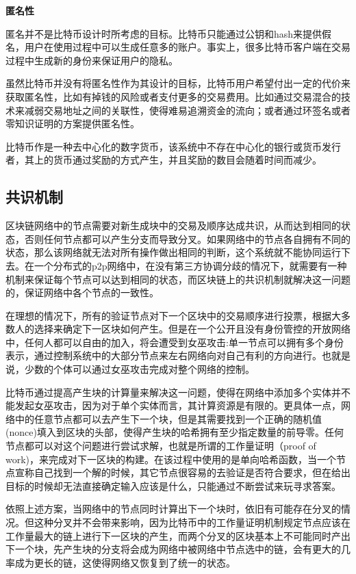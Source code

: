 \noindent\textbf{匿名性}

匿名并不是比特币设计时所考虑的目标。比特币只能通过公钥和hash来提供假名，用户在使用过程中可以生成任意多的账户。事实上，很多比特币客户端在交易过程中生成新的身份来保证用户的隐私。

虽然比特币并没有将匿名性作为其设计的目标，比特币用户希望付出一定的代价来获取匿名性，比如有掉钱的风险或者支付更多的交易费用。比如通过交易混合\supercite{bonneau2014mixcoin}的技术来减弱交易地址之间的关联性，使得难易追溯资金的流向；或者通过环签名或者零知识证明\supercite{kosba2016hawk}的方案提供匿名性。


比特币作是一种去中心化的数字货币，该系统中不存在中心化的银行或货币发行者，其上的货币通过奖励的方式产生，并且奖励的数目会随着时间而减少。

\subsection{共识机制}

区块链网络中的节点需要对新生成块中的交易及顺序达成共识，从而达到相同的状态，否则任何节点都可以产生分支而导致分叉。如果网络中的节点各自拥有不同的状态，那么该网络就无法对所有操作做出相同的判断，这个系统就不能协同运行下去。在一个分布式的p2p网络中，在没有第三方协调分歧的情况下，就需要有一种机制来保证每个节点可以达到相同的状态，而区块链上的共识机制就解决这一问题的，保证网络中各个节点的一致性。

在理想的情况下，所有的验证节点对下一个区块中的交易顺序进行投票，根据大多数人的选择来确定下一区块如何产生。但是在一个公开且没有身份管控的开放网络中，任何人都可以自由的加入，将会遭受到女巫攻击\supercite{douceur2002sybil}:单一节点可以拥有多个身份表示，通过控制系统中的大部分节点来左右网络向对自己有利的方向进行。也就是说，少数的个体可以通过女巫攻击完成对整个网络的控制。

比特币通过提高产生块的计算量来解决这一问题，使得在网络中添加多个实体并不能发起女巫攻击，因为对于单个实体而言，其计算资源是有限的。更具体一点，网络中的任意节点都可以去产生下一个块，但是其需要找到一个正确的随机值(nonce)填入到区块的头部，使得产生块的哈希拥有至少指定数量的前导零\supercite{antonopoulos2014mastering}。任何节点都可以对这个问题进行尝试求解，也就是所谓的工作量证明（proof of work)，来完成对下一区块的构建\supercite{nakamoto2008bitcoin}。在该过程中使用的是单向哈希函数，当一个节点宣称自己找到一个解的时候，其它节点很容易的去验证是否符合要求，但在给出目标的时候却无法直接确定输入应该是什么，只能通过不断尝试来玩寻求答案。

依照上述方案，当网络中的节点同时计算出下一个块时，依旧有可能存在分叉的情况。但这种分叉并不会带来影响，因为比特币中的工作量证明机制规定节点应该在工作量最大的链上进行下一区块的产生，而两个分叉的区块基本上不可能同时产出下一个块，先产生块的分支将会成为网络中被网络中节点选中的链，会有更大的几率成为更长的链，这使得网络又恢复到了统一的状态。

